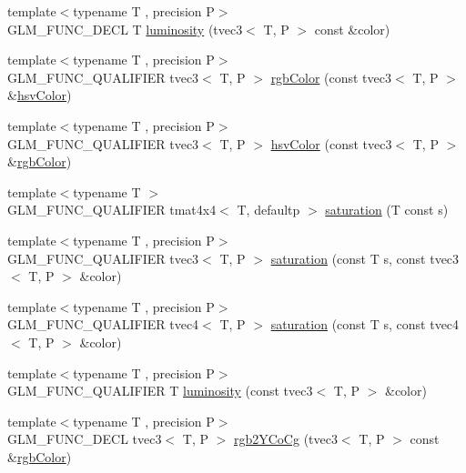 \begin{DoxyCompactItemize}
\item 
{\footnotesize template$<$typename T , precision P$>$ }\\G\+L\+M\+\_\+\+F\+U\+N\+C\+\_\+\+D\+E\+C\+L T \hyperlink{group__gtx__color__space_gaa2f38a5100c3e1c7d39920df43bd8cbe}{luminosity} (tvec3$<$ T, P $>$ const \&color)
\item 
{\footnotesize template$<$typename T , precision P$>$ }\\G\+L\+M\+\_\+\+F\+U\+N\+C\+\_\+\+Q\+U\+A\+L\+I\+F\+I\+E\+R tvec3$<$ T, P $>$ \hyperlink{namespaceglm_a1afccb32714b02393f92c3c7314b0cad}{rgb\+Color} (const tvec3$<$ T, P $>$ \&\hyperlink{group__gtx__color__space_gae72039c00a7be2f03a3b94b37a54349a}{hsv\+Color})
\item 
{\footnotesize template$<$typename T , precision P$>$ }\\G\+L\+M\+\_\+\+F\+U\+N\+C\+\_\+\+Q\+U\+A\+L\+I\+F\+I\+E\+R tvec3$<$ T, P $>$ \hyperlink{namespaceglm_ad74f0290be10b5cdb11661b9c90a5930}{hsv\+Color} (const tvec3$<$ T, P $>$ \&\hyperlink{group__gtx__color__space_ga36b0619e31daf57bc4a54dac2dcf34b7}{rgb\+Color})
\item 
{\footnotesize template$<$typename T $>$ }\\G\+L\+M\+\_\+\+F\+U\+N\+C\+\_\+\+Q\+U\+A\+L\+I\+F\+I\+E\+R tmat4x4$<$ T, defaultp $>$ \hyperlink{group__gtx__color__space_gafecfb15d58da8445103745af3348e516}{saturation} (T const s)
\item 
{\footnotesize template$<$typename T , precision P$>$ }\\G\+L\+M\+\_\+\+F\+U\+N\+C\+\_\+\+Q\+U\+A\+L\+I\+F\+I\+E\+R tvec3$<$ T, P $>$ \hyperlink{namespaceglm_aae342970d30d8cc21e39d98ef18386f1}{saturation} (const T s, const tvec3$<$ T, P $>$ \&color)
\item 
{\footnotesize template$<$typename T , precision P$>$ }\\G\+L\+M\+\_\+\+F\+U\+N\+C\+\_\+\+Q\+U\+A\+L\+I\+F\+I\+E\+R tvec4$<$ T, P $>$ \hyperlink{namespaceglm_ac26a12e169b037ffdb90aacec20b509b}{saturation} (const T s, const tvec4$<$ T, P $>$ \&color)
\item 
{\footnotesize template$<$typename T , precision P$>$ }\\G\+L\+M\+\_\+\+F\+U\+N\+C\+\_\+\+Q\+U\+A\+L\+I\+F\+I\+E\+R T \hyperlink{namespaceglm_adc99d2d14a8a295798f9d265e64234db}{luminosity} (const tvec3$<$ T, P $>$ \&color)
\item 
{\footnotesize template$<$typename T , precision P$>$ }\\G\+L\+M\+\_\+\+F\+U\+N\+C\+\_\+\+D\+E\+C\+L tvec3$<$ T, P $>$ \hyperlink{group__gtx__color__space___y_co_cg_ga19481f6947c5b5482debd41e71b8c941}{rgb2\+Y\+Co\+Cg} (tvec3$<$ T, P $>$ const \&\hyperlink{group__gtx__color__space_ga36b0619e31daf57bc4a54dac2dcf34b7}{rgb\+Color})

\end{DoxyCompactItemize}
